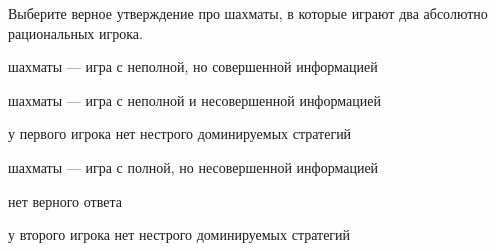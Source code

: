 
\begin{question}
Выберите верное утверждение про шахматы, в которые играют два абсолютно рациональных игрока.
\begin{answerlist}
  \item шахматы --- игра с неполной, но совершенной информацией
  \item шахматы --- игра с неполной и несовершенной информацией
  \item у первого игрока нет нестрого доминируемых стратегий
  \item шахматы --- игра с полной, но несовершенной информацией
  \item нет верного ответа
  \item у второго игрока нет нестрого доминируемых стратегий
\end{answerlist}
\end{question}


